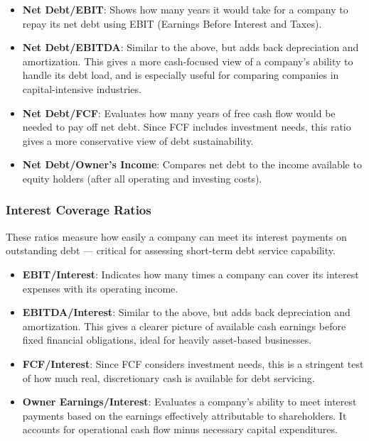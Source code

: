 \documentclass[11pt,english,a4paper,hidelinks]{book}
\begin{document}
\begin{itemize}
    \item \textbf{Net Debt/EBIT}: Shows how many years it would take for a company to repay its net debt using EBIT (Earnings Before Interest and Taxes).
    
    \item \textbf{Net Debt/EBITDA}: Similar to the above, but adds back depreciation and amortization. This gives a more cash-focused view of a company's ability to handle its debt load, and is especially useful for comparing companies in capital-intensive industries.
    
    \item \textbf{Net Debt/FCF}: Evaluates how many years of free cash flow would be needed to pay off net debt. Since FCF includes investment needs, this ratio gives a more conservative view of debt sustainability.
    
    \item \textbf{Net Debt/Owner's Income}: Compares net debt to the income available to equity holders (after all operating and investing costs).
\end{itemize}

\subsubsection{Interest Coverage Ratios}
These ratios measure how easily a company can meet its interest payments on outstanding debt — critical for assessing short-term debt service capability.

\begin{itemize}
    \item \textbf{EBIT/Interest}: Indicates how many times a company can cover its interest expenses with its operating income.
    
    \item \textbf{EBITDA/Interest}: Similar to the above, but adds back depreciation and amortization. This gives a clearer picture of available cash earnings before fixed financial obligations, ideal for heavily asset-based businesses.
    
    \item \textbf{FCF/Interest}: Since FCF considers investment needs, this is a stringent test of how much real, discretionary cash is available for debt servicing.
    
    \item \textbf{Owner Earnings/Interest}: Evaluates a company's ability to meet interest payments based on the earnings effectively attributable to shareholders. It accounts for operational cash flow minus necessary capital expenditures.
\end{itemize}
\end{document}
